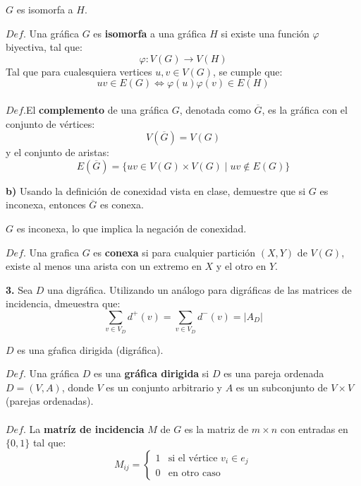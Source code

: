 \documentclass[12pt]{article}
\begin{document}
\begin{tcolorbox}[title=\textbf{Hipotesis}, colback=red!15!white, colframe=black!, breakable]
    $G$ es isomorfa a $H$.
\end{tcolorbox}
\begin{tcolorbox}[title=\textbf{Definiciones}, colback=blue!15!white, colframe=black!, breakable]
    $Def$. Una gráfica $G$ es \textbf{isomorfa} a una gráfica $H$ si existe una función $\varphi$ biyectiva, tal que:
    \[\varphi: V(G) \rightarrow V(H)\]
    Tal que para cualesquiera vertices $u,v \in V(G)$, se cumple que:
    \[uv \in E(G) \Leftrightarrow \varphi(u)\varphi(v) \in E(H)\]
    \\
    $Def$.El \textbf{complemento} de una gráfica $G$, denotada como $\overline{G}$, es la gráfica con el conjunto de vértices:
    \[V(\overline{G}) = V(G)\]
    y el conjunto de aristas:
    \[E(\overline{G}) = \{ uv \in V(G) \times V(G) \mid uv \notin E(G)\}\]
\end{tcolorbox}

\textbf{b)} Usando la definición de conexidad vista en clase, demuestre que si $G$ es inconexa,
entonces $\overline{G}$ es conexa.
\begin{tcolorbox}[title=\textbf{Hipotesis}, colback=red!15!white, colframe=black!]
    $G$ es inconexa, lo que implica la negación de conexidad.
\end{tcolorbox}
\begin{tcolorbox}[title=\textbf{Definiciones}, colback=blue!15!white, colframe=black!]
    $Def$. Una grafica $G$ es \textbf{conexa} si para cualquier partición $(X,Y)$ de $V(G)$, existe al menos una arista con un extremo
    en $X$ y el otro en $Y$.
\end{tcolorbox}

\vspace{1cm}

%
%
\textbf{3.} Sea $D$ una digráfica. Utilizando un análogo para digráficas de las matrices de incidencia, dmeuestra que:\\
\[
\sum_{\displaystyle v \in V_D} d^{+}(v) = \sum_{\displaystyle v \in V_D} d^{-}(v) = |A_D|
\]
\begin{tcolorbox}[title=\textbf{Hipotesis}, colback=red!15!white, colframe=black!]
    $D$ es una gŕafica dirigida (digráfica).
\end{tcolorbox}
\begin{tcolorbox}[title=\textbf{Definiciones}, colback=blue!15!white, colframe=black!]
    $Def$. Una gráfica $D$ es una \textbf{gráfica dirigida} si $D$ es una pareja ordenada $D=(V,A)$, donde
    $V$ es un conjunto arbitrario y $A$ es un subconjunto de $V \times V$ (parejas ordenadas).
    \\
    \\
    $Def$. La \textbf{matríz de incidencia} $M$ de $G$ es la matriz de $m \times n$ con entradas en $\{0, 1\}$ tal que:
    \[M_{ij} = \begin{cases} 1 & \text{si el vértice } v_i \in e_j\\ 0 & \text{en otro caso} \end{cases}\]

\end{tcolorbox}
\end{document}
